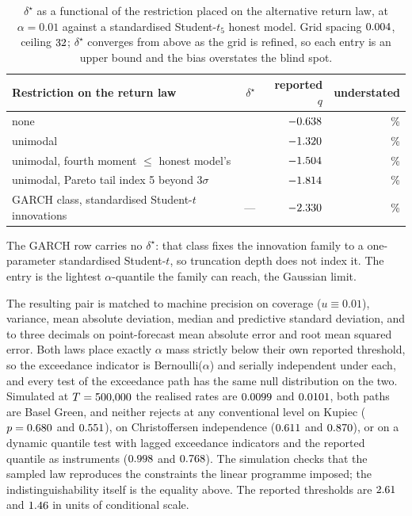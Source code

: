 \documentclass[preprint,11pt,authoryear]{elsarticle}
\newcommand{\1}{\boldsymbol{1}}
\begin{document}
\begin{table}[H]
	\centering
	\caption{$\delta^\star$ as a functional of the restriction placed on the
		alternative return law, at $\alpha = 0.01$ against a standardised
		Student-$t_5$ honest model. Grid spacing $0.004$, ceiling
		$32$;
		$\delta^\star$ converges from above as the grid is refined, so each entry
		is an upper bound and the bias overstates the blind spot.}
	\label{tab:delta_by_class}
	\footnotesize
	\begin{tabular}{@{}lrrr@{}}
		\hline\hline
		Restriction on the return law & $\delta^\star$ & reported $q$ & understated \\
		\hline
		none & \nGapDeltaFree & $-0.638$ & \nGapUndFree\% \\
		unimodal & \nGapDeltaUni & $-1.320$ & \nGapUndUni\% \\
		unimodal, fourth moment $\le$ honest model's & \nSupDeltaClassMoment & $-1.504$ & \nSupUndClassMoment\% \\
		unimodal, Pareto tail index 5 beyond $3\sigma$ & \nSupDeltaClassPareto & $-1.814$ & \nSupUndClassPareto\% \\
		GARCH class, standardised Student-$t$ innovations & --- & $-2.330$ & \nSupUndClassGarchT\% \\
		\hline\hline
	\end{tabular}
	\begin{minipage}{\linewidth}\scriptsize
		\smallskip
		The GARCH row carries no $\delta^\star$: that class fixes the innovation
		family to a one-parameter standardised Student-$t$, so truncation depth
		does not index it. The entry is the lightest $\alpha$-quantile the family
		can reach, the Gaussian limit.
	\end{minipage}
\end{table}

The resulting pair is matched to machine precision on coverage
($u \equiv 0.01$), variance, mean absolute deviation, median and predictive
standard deviation, and to three decimals on point-forecast mean absolute error
and root mean squared error. Both laws place exactly $\alpha$ mass strictly below
their own reported threshold, so the exceedance indicator is Bernoulli($\alpha$)
and serially independent under each, and every test of the exceedance path has
the same null distribution on the two. Simulated at $T = 500{,}000$ the realised
rates are $0.0099$ and $0.0101$, both paths are Basel Green,
and neither rejects at any conventional level on Kupiec
($p = 0.680$ and $0.551$), on Christoffersen independence
($0.611$ and $0.870$), or on a dynamic quantile test with
\nSupPairDQLags{} lagged exceedance indicators and the reported quantile as
instruments ($0.998$ and $0.768$). The simulation checks
that the sampled law reproduces the constraints the linear programme imposed;
the indistinguishability itself is the equality above. The reported thresholds
are $2.61$ and $1.46$ in units of conditional scale.
\end{document}
